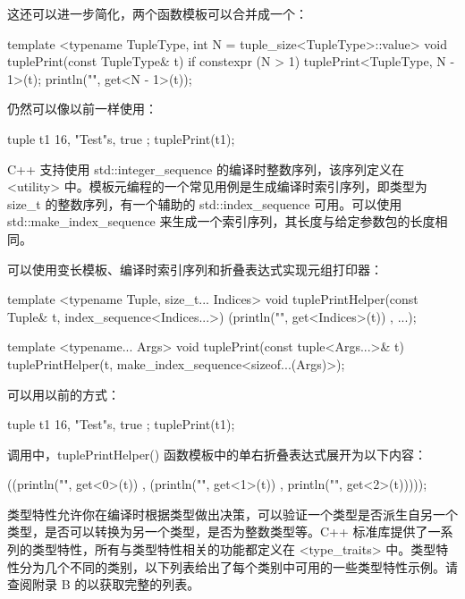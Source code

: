 这还可以进一步简化，两个函数模板可以合并成一个：

\begin{cpp}
template <typename TupleType, int N = tuple_size<TupleType>::value>
void tuplePrint(const TupleType& t)
{
    if constexpr (N > 1) {
        tuplePrint<TupleType, N - 1>(t);
    }
    println("{}", get<N - 1>(t));
}
\end{cpp}

仍然可以像以前一样使用：

\begin{cpp}
tuple t1 { 16, "Test"s, true };
tuplePrint(t1);
\end{cpp}


C++ 支持使用 std::integer\_sequence 的编译时整数序列，该序列定义在 <utility> 中。模板元编程的一个常见用例是生成编译时索引序列，即类型为 size\_t 的整数序列，有一个辅助的 std::index\_sequence 可用。可以使用 std::make\_index\_sequence 来生成一个索引序列，其长度与给定参数包的长度相同。

可以使用变长模板、编译时索引序列和折叠表达式实现元组打印器：

\begin{cpp}
template <typename Tuple, size_t... Indices>
void tuplePrintHelper(const Tuple& t, index_sequence<Indices...>)
{
    (println("{}", get<Indices>(t)) , ...);
}

template <typename... Args>
void tuplePrint(const tuple<Args...>& t)
{
    tuplePrintHelper(t, make_index_sequence<sizeof...(Args)>{});
}
\end{cpp}

可以用以前的方式：

\begin{cpp}
tuple t1 { 16, "Test"s, true };
tuplePrint(t1);
\end{cpp}

调用中，tuplePrintHelper() 函数模板中的单右折叠表达式展开为以下内容：

\begin{cpp}
((println("{}", get<0>(t)) ,
 (println("{}", get<1>(t)) ,
  println("{}", get<2>(t)))));
\end{cpp}



类型特性允许你在编译时根据类型做出决策，可以验证一个类型是否派生自另一个类型，是否可以转换为另一个类型，是否为整数类型等。C++ 标准库提供了一系列的类型特性，所有与类型特性相关的功能都定义在 <type\_traits> 中。类型特性分为几个不同的类别，以下列表给出了每个类别中可用的一些类型特性示例。请查阅附录 B 的以获取完整的列表。

